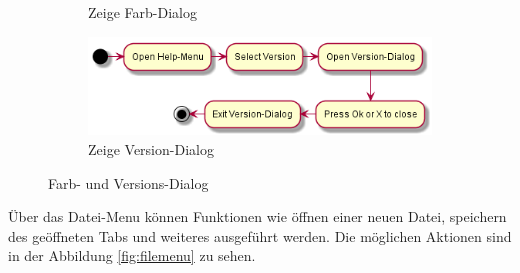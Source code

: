 \begin{figure}[H]
\begin{subfigure}[b]{0.45\linewidth}
        \caption{Zeige Farb-Dialog}
    \end{subfigure}
    \begin{subfigure}[b]{0.45\linewidth}
        \centering
        \includegraphics[width=\linewidth]{figures/version/version.png}
        \caption{Zeige Version-Dialog}
    \end{subfigure}
    \caption{Farb- und Versions-Dialog}
    \label{fig:dialogs}
\end{figure}

Über das Datei-Menu können Funktionen wie öffnen einer neuen Datei, speichern des geöffneten Tabs und weiteres 
ausgeführt werden. Die möglichen Aktionen sind in der Abbildung \ref{fig:filemenu} zu sehen.

